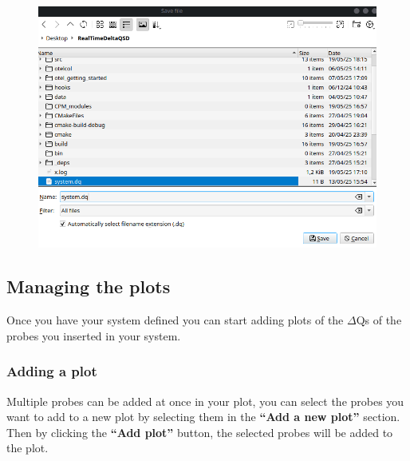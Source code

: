     
    \begin{figure}[H]
        \begin{center}
            \includegraphics[width = \textwidth]{img/save_system.png}
        \end{center}
    \end{figure}
        
\subsection{Managing the plots} 
    Once you have your system defined you can start adding plots of the $\Delta$Qs of the probes you inserted in your system.
    
    \subsubsection{Adding a plot}

    Multiple probes can be added at once in your plot, you can select the probes you want to add to a new plot by selecting them in the \textbf{``Add a new plot''} section. Then by clicking the \textbf{``Add plot''} button, the selected probes will be added to the plot. 
 
